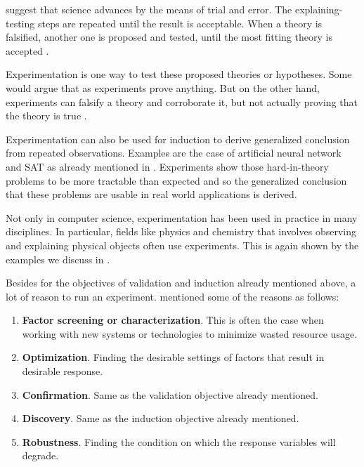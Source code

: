  suggest that science advances by the means of trial and error.
The explaining-testing steps are repeated until the result is acceptable.
When a theory is falsified, another one is proposed and tested, until the most fitting theory is accepted \citep{wallimanResearchMethodsBasics2010a}.

Experimentation is one way to test these proposed theories or hypotheses.
Some would argue that as experiments  prove anything.
But on the other hand, experiments can falsify a theory and corroborate it, but not actually proving that the theory is true \citep{tichyShouldComputerScientists1998}.

Experimentation can also be used for induction to derive generalized conclusion from repeated observations.
Examples are the case of artificial neural network and SAT as already mentioned in .
Experiments show those hard-in-theory problems to be more tractable than expected and so the generalized conclusion that these problems are usable in real world applications is derived.

Not only in computer science, experimentation has been used in practice in many disciplines.
In particular, fields like physics and chemistry that involves observing and explaining physical objects often use experiments.
This is again shown by the examples we discuss in .

Besides for the objectives of validation and induction already mentioned above,  a lot of reason to run an experiment.
\citet{montgomeryDesignAnalysisExperiments2013} mentioned some of the reasons as follows:
\begin {enumerate}[noitemsep]
	\item \textbf{Factor screening or characterization}. This is often the case when working with new systems or technologies to minimize wasted resource usage.
	\item \textbf{Optimization}. Finding the desirable settings of factors that result in desirable response.
	\item \textbf{Confirmation}. Same as the validation objective already mentioned.
	\item \textbf{Discovery}. Same as the induction objective already mentioned.
	\item \textbf{Robustness}. Finding the condition on which the response variables will degrade.
\end{enumerate}

